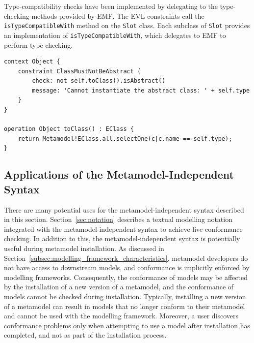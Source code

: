 Type-compatibility checks have been implemented by delegating to the type-checking methods provided by EMF. The EVL constraints call the \texttt{isTy\-peCo\-mp\-at\-ib\-leWi\-th} method on the \texttt{Sl\-ot} class. Each subclass of \texttt{Sl\-ot} provides an implementation of \texttt{isTy\-peCo\-mp\-at\-ib\-leWi\-th}, which delegates to EMF to perform type-checking.

\begin{lstlisting}[caption={[Consistency constraint for instantiating a metamodel type]A constraint (in EVL) to check that only concrete metamodel types are instantiated}, label=lst:conformance_constraint, language=EVL, float=tb]
context Object {
	constraint ClassMustNotBeAbstract {
		check: not self.toClass().isAbstract()
		message: 'Cannot instantiate the abstract class: ' + self.type
	}
}

operation Object toClass() : EClass {
	return Metamodel!EClass.all.selectOne(c|c.name == self.type);
}
\end{lstlisting}


\subsection{Applications of the Metamodel-Independent Syntax} 
There  are many potential uses for the metamodel-independent syntax described in this section. Section~\ref{sec:notation} describes a textual modelling notation integrated with the metamodel-independent syntax to achieve live conformance checking. In addition to this, the metamodel-independent syntax is potentially useful during metamodel installation. As discussed in Section~\ref{subsec:modelling_framework_characteristics}, metamodel developers do not have access to downstream models, and conformance is implicitly enforced by modelling frameworks. Consequently, the conformance of models may be affected by the installation of a new version of a metamodel, and the conformance of models cannot be checked during installation. Typically, installing a new version of a metamodel can result in models that no longer conform to their metamodel and cannot be used with the modelling framework. Moreover, a user discovers conformance problems only when attempting to use a model after installation has completed, and not as part of the installation process.

